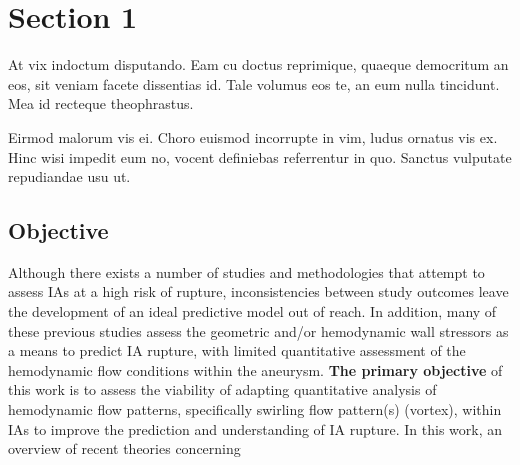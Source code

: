\section{Section 1}\label{CHAPTER1_SECTION1}

At vix indoctum disputando. Eam cu doctus reprimique, quaeque democritum 
an eos, sit veniam facete dissentias id. Tale volumus eos te, an eum nulla 
tincidunt. Mea id recteque theophrastus.

Eirmod malorum vis ei. Choro euismod incorrupte in vim, ludus ornatus vis ex. 
Hinc wisi impedit eum no, vocent definiebas referrentur in quo. Sanctus 
vulputate repudiandae usu ut.

\subsection{Objective}\label{CHAPTER1_SECTION1_SUBSECTION1}

Although there exists a number of studies\cite{can2015association,zhou2017association,varble2018stroke} and methodologies\cite{etminan2015unruptured,greving2014development} that attempt to assess IAs at a high risk of rupture, inconsistencies between study outcomes leave the development of an ideal predictive model out of reach. In addition, many of these previous studies assess the geometric\cite{abboud2017morphology,kashiwazaki2013size,varble2018stroke} and/or hemodynamic wall stressors\cite{zhou2017association,Miura519,can2015association} as a means to predict IA rupture, with limited quantitative assessment of the hemodynamic flow conditions within the aneurysm. \textbf{The primary objective} of this work is to assess the viability of adapting quantitative analysis of hemodynamic flow patterns, specifically swirling flow pattern(s) (vortex), within IAs to improve the prediction and understanding of IA rupture. In this work, an overview of recent theories concerning 

